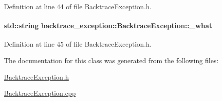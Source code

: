 Definition at line 44 of file Backtrace\+Exception.\+h.

\paragraph[{\texorpdfstring{\+\_\+what}{_what}}]{\setlength{\rightskip}{0pt plus 5cm}std\+::string backtrace\+\_\+exception\+::\+Backtrace\+Exception\+::\+\_\+what\hspace{0.3cm}{\ttfamily [protected]}}\hypertarget{classbacktrace__exception_1_1BacktraceException_ad935d6512b6b4a6c4ea79843391b5a1e}{}\label{classbacktrace__exception_1_1BacktraceException_ad935d6512b6b4a6c4ea79843391b5a1e}


Definition at line 45 of file Backtrace\+Exception.\+h.



The documentation for this class was generated from the following files\+:\begin{DoxyCompactItemize}
\item 
\hyperlink{BacktraceException_8h}{Backtrace\+Exception.\+h}\item 
\hyperlink{BacktraceException_8cpp}{Backtrace\+Exception.\+cpp}\end{DoxyCompactItemize}
